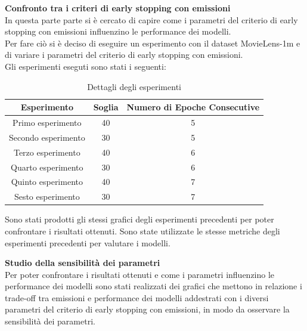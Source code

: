 \noindent\textbf{Confronto tra i criteri di early stopping con emissioni}\\
In questa parte parte si è cercato di capire come i parametri del criterio di early stopping con emissioni influenzino le performance dei modelli.\\
Per fare ciò si è deciso di eseguire un esperimento con il dataset MovieLens-1m e di variare i parametri del criterio di early stopping con emissioni.\\
Gli esperimenti eseguti sono stati i seguenti:

\begin{table}[h!]
    \centering
    \begin{tabular}{|c|c|c|}
    \hline
    \textbf{Esperimento} & \textbf{Soglia} & \textbf{Numero di Epoche Consecutive} \\
    \hline
    Primo esperimento & 40 & 5 \\
    \hline
    Secondo esperimento & 30 & 5 \\
    \hline
    Terzo esperimento & 40 & 6 \\
    \hline
    Quarto esperimento & 30 & 6 \\
    \hline
    Quinto esperimento & 40 & 7 \\
    \hline
    Sesto esperimento & 30 & 7 \\
    \hline
    \end{tabular}
    \caption{Dettagli degli esperimenti}
\end{table}

\noindent Sono stati prodotti gli stessi grafici degli esperimenti precedenti per poter confrontare i risultati ottenuti. Sono state utilizzate le stesse metriche degli esperimenti precedenti per valutare i modelli.

\noindent\textbf{Studio della sensibilità dei parametri}\\
\noindent Per poter confrontare i risultati ottenuti e come i parametri influenzino le performance dei modelli sono stati realizzati dei grafici che mettono in relazione i trade-off tra emissioni e performance dei modelli addestrati con i diversi parametri del criterio di early stopping con emissioni, in modo da osservare la sensibilità dei parametri.
